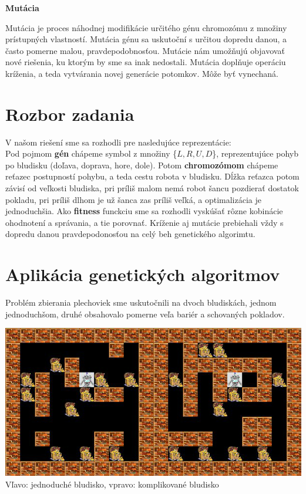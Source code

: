 \documentclass[10pt]{paper}
\begin{document}
\noindent \textbf{Mutácia}

Mutácia je proces náhodnej modifikácie určitého génu chromozómu z množiny prístupných vlastností. Mutácia génu sa uskutoční s určitou dopredu danou, a často pomerne malou, pravdepodobnosťou. Mutácie nám umožňujú objavovať nové riešenia, ku ktorým by sme sa inak nedostali. Mutácia doplňuje operáciu kríženia, a teda vytvárania novej generácie potomkov. Môže byť vynechaná.

\newpage

\section{Rozbor zadania}

V našom riešení sme sa rozhodli pre nasledujúce reprezentácie: \\

Pod pojmom \textbf{gén} chápeme symbol z množiny \{$L,R,U,D$\}, reprezentujúce pohyb po bludisku (doľava, doprava, hore, dole). Potom \textbf{chromozómom} chápeme reťazec postupností pohybu, a teda cestu robota v bludisku. Dĺžka reťazca potom závisí od veľkosti bludiska, pri príliš malom nemá robot šancu pozdierať dostatok pokladu, pri príliš dlhom je už šanca zas príliš veľká, a optimalizácia je jednoduchšia. Ako \textbf{fitness} funckciu sme sa rozhodli vyskúšať rôzne kobinácie ohodnotení a správania, a tie porovnať.
Kríženie aj mutácie prebiehali vždy s dopredu danou pravdepodonosťou na celý beh genetického algorimtu.


\section{Aplikácia genetických algoritmov}
Problém zbierania plechoviek sme uskutočnili na dvoch bludiskách, jednom jednoduchšom, druhé obsahovalo pomerne veľa bariér a schovaných pokladov.

\begin{center}
  \includegraphics[scale=0.6]{combine_images.jpg} \\
	Vľavo: jednoduché bludisko, vpravo: komplikované bludisko
     \end{center}
\end{document}
